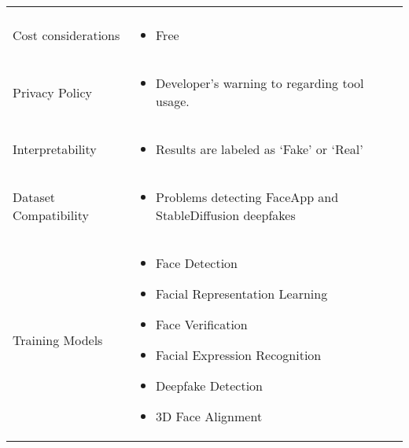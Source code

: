 \begin{table}[htpb]
\begin{tabularx}{\textwidth}{l X}
\begin{itemize}
		                               \end{itemize}                                                                     \\
		\addlinespace
		Cost considerations          & \begin{itemize}
			                               \item Free
		                               \end{itemize}                                                                     \\
		\addlinespace
		Privacy Policy               & \begin{itemize}
			                               \item Developer's warning to \cite{facetorch-privacy} regarding tool usage.
		                               \end{itemize}         \\
		\addlinespace
		Interpretability             & \begin{itemize}
			                               \item Results are labeled as `Fake' or `Real'
		                               \end{itemize}                                       \\
		\addlinespace
		Dataset Compatibility        & \begin{itemize}
			                               \item Problems detecting FaceApp and StableDiffusion deepfakes
		                               \end{itemize}                      \\
		\addlinespace
		Training Models              & \begin{itemize}
			                               \item Face Detection~\cite{Deng_2020_CVPR}
			                               \item Facial Representation Learning~\cite{bulat2022pretraining}
			                               \item Face Verification~\cite{jung2022unified,kim2023adaface}
			                               \item Facial Expression Recognition~\cite{9582508}
			                               \item Deepfake Detection~\cite{Luo_2022,seferbekov-github}
			                               \item 3D Face Alignment~\cite{wu2021synergy}

\end{itemize}
\end{tabularx}
\end{table}

